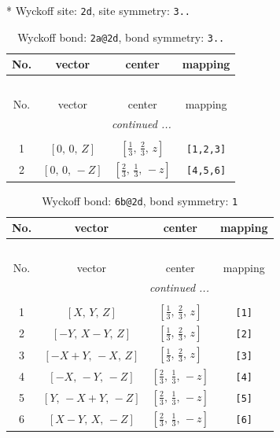 \documentclass[fleqn,8pt]{jsarticle}
\begin{document}
* Wyckoff site: {\tt 2d}, site symmetry: {\tt 3..}
\renewcommand{\arraystretch}{1.2}
\begin{longtable}{cccc}
\caption{Wyckoff bond: {\tt 2a@2d}, bond symmetry: {\tt 3..}}
 \\
 \hline \hline
No. & vector & center & mapping \\ \hline \endfirsthead

\multicolumn{3}{l}{\tablename\ \thetable{}} \\
 \hline \hline
No. & vector & center & mapping \\ \hline \endhead

 \hline \hline
\multicolumn{3}{r}{\footnotesize\it continued ...} \\ \endfoot

 \hline \hline
\multicolumn{3}{r}{} \\ \endlastfoot

1 & $\left[ 0,\, 0,\, Z \right]$ & $\left[ \frac{1}{3},\, \frac{2}{3},\, z \right]$ & {\tt [1,2,3]} \\ \hline
2 & $\left[ 0,\, 0,\, - Z \right]$ & $\left[ \frac{2}{3},\, \frac{1}{3},\, - z \right]$ & {\tt [4,5,6]} \\
\end{longtable}
\renewcommand{\arraystretch}{1.2}
\begin{longtable}{cccc}
\caption{Wyckoff bond: {\tt 6b@2d}, bond symmetry: {\tt 1}}
 \\
 \hline \hline
No. & vector & center & mapping \\ \hline \endfirsthead

\multicolumn{3}{l}{\tablename\ \thetable{}} \\
 \hline \hline
No. & vector & center & mapping \\ \hline \endhead

 \hline \hline
\multicolumn{3}{r}{\footnotesize\it continued ...} \\ \endfoot

 \hline \hline
\multicolumn{3}{r}{} \\ \endlastfoot

1 & $\left[ X,\, Y,\, Z \right]$ & $\left[ \frac{1}{3},\, \frac{2}{3},\, z \right]$ & {\tt [1]} \\ \hline
2 & $\left[ - Y,\, X - Y,\, Z \right]$ & $\left[ \frac{1}{3},\, \frac{2}{3},\, z \right]$ & {\tt [2]} \\ \hline
3 & $\left[ - X + Y,\, - X,\, Z \right]$ & $\left[ \frac{1}{3},\, \frac{2}{3},\, z \right]$ & {\tt [3]} \\ \hline
4 & $\left[ - X,\, - Y,\, - Z \right]$ & $\left[ \frac{2}{3},\, \frac{1}{3},\, - z \right]$ & {\tt [4]} \\ \hline
5 & $\left[ Y,\, - X + Y,\, - Z \right]$ & $\left[ \frac{2}{3},\, \frac{1}{3},\, - z \right]$ & {\tt [5]} \\ \hline
6 & $\left[ X - Y,\, X,\, - Z \right]$ & $\left[ \frac{2}{3},\, \frac{1}{3},\, - z \right]$ & {\tt [6]} \\
\end{longtable}
\end{document}
